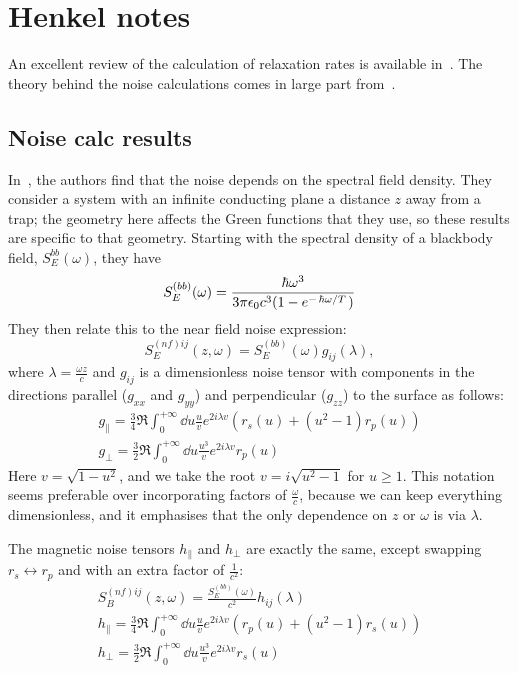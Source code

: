 \documentclass[11pt]{article}
\begin{document}
	\graphicspath{{figures/}}

	\section{Henkel notes} \label{sec:NoiseCalc}
	An excellent review of the calculation of relaxation rates is available in~\cite{Henkel1999}.
	The theory behind the noise calculations comes in large part from~\cite{Agarwal1975}.

	\subsection{Noise calc results} \label{subsec:NoiseCalcResults}
	In~\cite{Henkel1999}, the authors find that the noise depends on the spectral field density.
	They consider a system with an infinite conducting plane a distance $z$ away from a trap;
	the geometry here affects the Green functions that they use, so these results are specific to that geometry.
	Starting with the spectral density of a blackbody field, $S^{bb}_E(\omega)$, they have
	\begin{equation}
		S^{(bb)}_E(\omega) = \frac{\hbar \omega^3}{3 \pi \epsilon_0 c^3 (1 - e^{-\flatfrac{\hbar \omega}{T}})}
	\end{equation}
	They then relate this to the near field noise expression:
	\begin{equation}
		S^{(nf)ij}_E(z, \omega) = S^{(bb)}_E(\omega) g_{ij}(\lambda),
	\end{equation}
	where $\lambda = \frac{\omega z}{c}$ and $g_{ij}$ is a dimensionless noise tensor with components in the directions parallel ($g_{xx}$ and $g_{yy}$) and perpendicular ($g_{zz}$) to the surface as follows:
	\begin{gather}
		g_\parallel = \frac34 \Re \int_0^{+\infty} \dd{u} \frac{u}{v} e^{2i \lambda v} \left(r_s(u) + \left(u^2 - 1\right) r_p(u) \right) \\
		g_\perp = \frac32 \Re \int_0^{+\infty} \dd{u} \frac{u^3}{v} e^{2 i \lambda v} r_p(u)
	\end{gather}
	Here $v = \sqrt{1 - u^2}$, and we take the root $v = i \sqrt{u^2 - 1}$ for $u \geq 1$.
	This notation seems preferable over incorporating factors of $\frac{\omega}{c}$, because we can keep everything dimensionless, and it emphasises that the only dependence on $z$ or $\omega$ is via $\lambda$.

	The magnetic noise tensors $h_\parallel$ and $h_\perp$ are exactly the same, except swapping $r_s \leftrightarrow r_p$ and with an extra factor of $\frac{1}{c^2}$:
	\begin{gather}
		S^{(nf)ij}_B(z, \omega) = \frac{S^{(bb)}_E(\omega)}{c^2} h_{ij}(\lambda) \\
		h_\parallel = \frac34 \Re \int_0^{+\infty} \dd{u} \frac{u}{v} e^{2i \lambda v} \left(r_p(u) + \left(u^2 - 1\right) r_s(u) \right) \\
		h_\perp = \frac32 \Re \int_0^{+\infty} \dd{u} \frac{u^3}{v} e^{2 i \lambda v} r_s(u)
	\end{gather}
\end{document}
